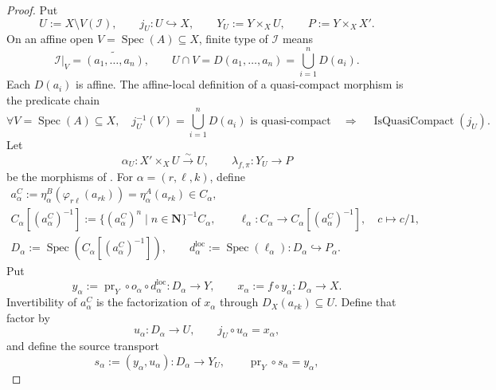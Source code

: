 \begin{proof}
  Put
  \[
    U:=X\setminus V(\mathcal I),
    \qquad j_U\colon U\hookrightarrow X,
    \qquad Y_U:=Y\times_XU,
    \qquad P:=Y\times_XX'.
  \]
  On an affine open $V=\operatorname{Spec}(A)\subseteq X$, finite type of
  $\mathcal I$ means
  \[
    \mathcal I|_V=\widetilde{(a_1,\ldots,a_n)},
    \qquad
    U\cap V=D(a_1,\ldots,a_n)=\bigcup_{i=1}^{n}D(a_i).
  \]
  Each $D(a_i)$ is affine.  The affine-local definition of a quasi-compact
  morphism is the predicate chain
  \[
    \forall V=\operatorname{Spec}(A)\subseteq X,\quad
      j_U^{-1}(V)=\bigcup_{i=1}^{n}D(a_i)\text{ is quasi-compact}
    \quad\Longrightarrow\quad
      \operatorname{IsQuasiCompact}(j_U).                       \tag{ST5c}
  \]
  Let
  \[
    \alpha_U\colon X'\times_XU\xrightarrow{\sim}U,
    \qquad
    \lambda_{f,\pi}\colon Y_U\to P
  \]
  be the morphisms of
  .
  For $\alpha=(r,\ell,k)$, define
  \[
  \begin{gathered}
    a^C_\alpha:=
      \eta^B_\alpha(\varphi_{r\ell}(a_{rk}))
      =\eta^A_\alpha(a_{rk})\in C_\alpha,\\
    C_\alpha[(a^C_\alpha)^{-1}]
      :=\{(a^C_\alpha)^n\mid n\in\mathbf N\}^{-1}C_\alpha,\qquad
    \ell_\alpha\colon C_\alpha\to C_\alpha[(a^C_\alpha)^{-1}],
      \quad c\mapsto c/1,\\
    D_\alpha:=\operatorname{Spec}(C_\alpha[(a^C_\alpha)^{-1}]),\qquad
    d^{\mathrm{loc}}_\alpha:=\operatorname{Spec}(\ell_\alpha)
      \colon D_\alpha\hookrightarrow P_\alpha.
  \end{gathered}                                                  \tag{ST6}
  \]
  Put
  \[
    y_\alpha:=\operatorname{pr}_Y\circ o_\alpha\circ
      d^{\mathrm{loc}}_\alpha\colon D_\alpha\to Y,
    \qquad
    x_\alpha:=f\circ y_\alpha\colon D_\alpha\to X.
  \]
  Invertibility of $a^C_\alpha$ is the factorization of $x_\alpha$ through
  $D_X(a_{rk})\subseteq U$.  Define that factor by
  \[
    u_\alpha\colon D_\alpha\to U,
    \qquad
    j_U\circ u_\alpha=x_\alpha,
  \]
  and define the source transport
  \[
    s_\alpha:=(y_\alpha,u_\alpha)
      \colon D_\alpha\longrightarrow Y_U,
    \qquad
    \operatorname{pr}_Y\circ s_\alpha=y_\alpha,
\]
\end{proof}
